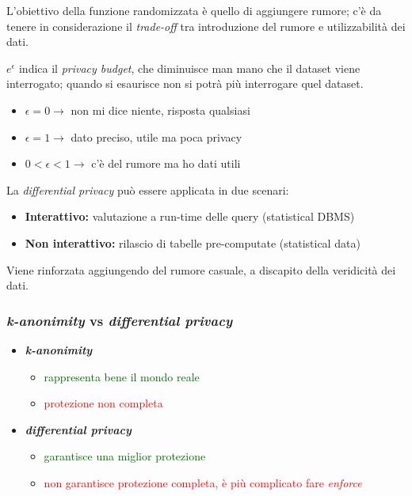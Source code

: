 \documentclass{report}
\begin{document}
L'obiettivo della funzione randomizzata è quello di aggiungere rumore;
c'è da tenere in considerazione il \textit{trade-off} tra introduzione del rumore 
e utilizzabilità dei dati. 

\noindent $e^\epsilon$ indica il \textit{privacy budget}, che diminuisce man mano che il dataset 
viene interrogato; quando si esaurisce non si potrà più interrogare quel dataset. 
\begin{itemize}
    \item $\epsilon = 0 \rightarrow$ non mi dice niente, risposta qualsiasi
    \item $\epsilon = 1 \rightarrow$ dato preciso, utile ma poca privacy
    \item $0 < \epsilon < 1 \rightarrow$ c'è del rumore ma ho dati utili
\end{itemize}

La \textit{differential privacy} può essere applicata in due scenari:
\begin{itemize}
    \item \textbf{Interattivo:} valutazione a run-time delle query (statistical DBMS)
    \item \textbf{Non interattivo:} rilascio di tabelle pre-computate (statistical data)
\end{itemize}

Viene rinforzata aggiungendo del rumore casuale, a discapito della veridicità dei dati.

\subsubsection{\textit{k-anonimity} vs \textit{differential privacy}}
\begin{itemize}
    \item \textbf{\textit{k-anonimity}}
    \begin{itemize}
        \item \textcolor{darkgreen}{rappresenta bene il mondo reale}
        \item \textcolor{red}{protezione non completa}
    \end{itemize}
    \item \textbf{\textit{differential privacy}}
    \begin{itemize}
        \item \textcolor{darkgreen}{garantisce una miglior protezione}
        \item \textcolor{red}{non garantisce protezione completa, è più complicato fare \textit{enforce}}
    \end{itemize}
\end{itemize}
\end{document}
